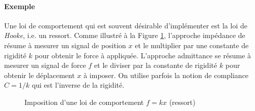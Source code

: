 \paragraph{Exemple} Une loi de comportement qui est souvent désirable d'implémenter est la loi de \textit{Hooke}, i.e. un ressort. Comme illustré à la Figure \ref{fig:impedanceadmitancespring}, l'approche impédance de résume à mesurer un signal de position $x$ et le multiplier par une constante de rigidité $k$ pour obtenir le force à appliquée. L'approche admittance se résume à mesurer un signal de force $f$ et le diviser par la constante de rigidité $k$ pour obtenir le déplacement $x$ à imposer. On utilise parfois la notion de compliance $C=1/k$ qui est l'inverse de la rigidité. 
\begin{figure}[H]
        \centering
				\hspace{5pt}
        \caption{Imposition d'une loi de comportement $f=kx$ (ressort)}
				\label{fig:impedanceadmitancespring}
\end{figure}

